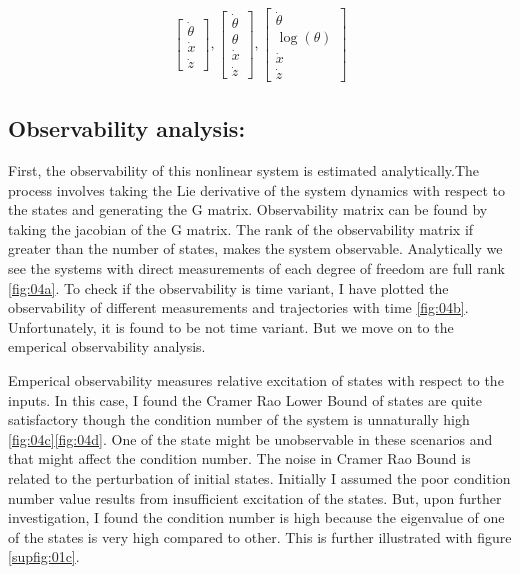 \documentclass[12pt]{article}
\begin{document}
\begin{align*}
    \left[\begin{matrix}\dot{\theta}\\\dot{x}\\\dot{z}\end{matrix}\right],
    \left[\begin{matrix}\dot{\theta}\\\theta\\\dot{x}\\\dot{z}\end{matrix}\right],
    \left[\begin{matrix}\dot{\theta}\\\log{\left(\theta \right)}\\\dot{x}\\\dot{z}\end{matrix}\right]
\end{align*}

\subsection*{Observability analysis:}
First, the observability of this nonlinear system is estimated analytically.The process involves taking the Lie derivative of the system dynamics with respect to the states and generating the G matrix. Observability matrix can be found by taking the jacobian of the G matrix. The rank of the observability matrix if greater than the number of states, makes the system observable. Analytically we see the systems with direct measurements of each degree of freedom are full rank \ref{fig:04a}. To check if the observability is time variant, I have plotted the observability of different measurements and trajectories with time \ref{fig:04b}. Unfortunately, it is found to be not time variant. But we move on to the emperical observability analysis.

Emperical observability measures relative excitation of states with respect to the inputs. In this case, I found the Cramer Rao Lower Bound of states are quite satisfactory though the condition number of the system is unnaturally high \ref{fig:04c}\ref{fig:04d}. One of the state might be unobservable in these scenarios and that might affect the condition number. The noise in Cramer Rao Bound is related to the perturbation of initial states. Initially I assumed the poor condition number value results from insufficient excitation of the states. But, upon further investigation, I found the condition number is high because the eigenvalue of one of the states is very high compared to other. This is further illustrated with figure \ref{supfig:01c}.
\end{document}
